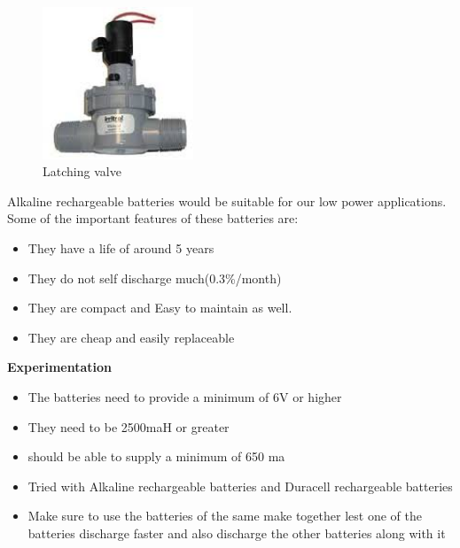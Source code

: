 \documentclass[16pt]{article}
\begin{document}
\hfill

\begin{figure}
\hspace{3cm}
\includegraphics[width=0.4\textwidth]{images/latch_valve.jpg}
\caption{Latching valve}
\end{figure}
\vspace{0.4cm}

Alkaline rechargeable batteries would be suitable for our low power
applications. Some of the important features of these batteries are:
\hfill
\begin{itemize}

\item
  They have a life of around 5 years
\item
  They do not self discharge much(0.3\%/month)
\item
  They are compact and Easy to maintain as well.
\item
  They are cheap and easily replaceable
\end{itemize}

\hfill

{\Large{\textbf{Experimentation}}}

\begin{itemize}

\item
  The batteries need to provide a minimum of 6V or higher
\item
  They need to be 2500maH or greater
\item
  should be able to supply a minimum of 650 ma
\item
  Tried with Alkaline rechargeable batteries and Duracell rechargeable
  batteries
\item
  Make sure to use the batteries of the same make together lest one of
  the batteries discharge faster and also discharge the other batteries
  along with it
\end{itemize}

\hfill
\end{document}
